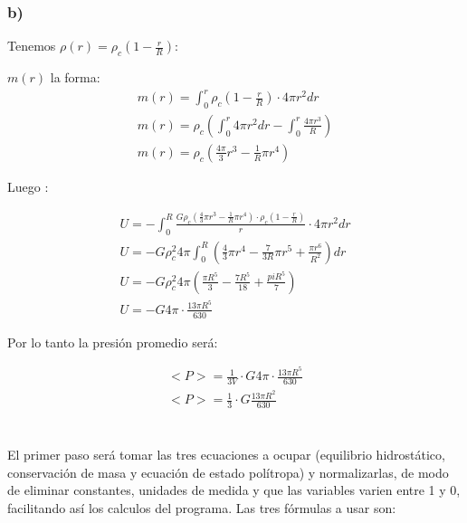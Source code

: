 \documentclass[2pt]{article}
\begin{document}
\subsubsection{b)}

Tenemos $\rho (r)=\rho_c (1-\frac{r}{R})$:

$m(r)$ la forma:
\begin{subequations}
\begin{align}
		m(r)=\int^r_0 \rho_c (1-\frac{r}{R}) \cdot 4\pi r^2 dr \\
		m(r)=\rho_c (\int^r_0 4\pi r^2 dr - \int^r_0 \frac{4\pi r^3}{R}) \\
		m(r)=\rho_c (\frac{4\pi}{3} r^3 - \frac{1}{R} \pi r^4)
\end{align}
\end{subequations}

Luego :

\begin{subequations}
\begin{align}
		U=-\int^R_0 \frac{G\rho_c (\frac{4}{3}\pi r^3 - \frac{1}{R}\pi r^4)\cdot \rho_c (1-\frac{r}{R})}{r} \cdot 4\pi r^2 dr \\
		U=-G\rho^2_c 4\pi \int^R_0 (\frac{4}{3} \pi r^4  - \frac{7}{3R} \pi r^5 + \frac{\pi r^6}{R^2}) dr \\
		U=-G\rho_c^2 4\pi (\frac{\pi R^5}{3} - \frac{7 R^5}{18} + \frac{pi R^5}{7}) \\
		U=-G4\pi  \cdot \frac{13\pi R^5}{630}
\end{align}
\end{subequations}

Por lo tanto la presión promedio será:

\begin{subequations}
\begin{align}
		<P>=\frac{1}{3V} \cdot G4\pi  \cdot \frac{13\pi R^5}{630}\\
		<P>=\frac{1}{3} \cdot G \frac{13\pi R^2}{630}
\end{align}
\end{subequations}

\section{}

El primer paso será tomar las tres ecuaciones a ocupar (equilibrio hidrostático, conservación de masa y ecuación de estado polítropa) y normalizarlas, de modo de eliminar constantes, unidades de medida y que las variables varien entre 1 y 0, facilitando así los calculos del programa. Las tres fórmulas a usar son:
\end{document}

